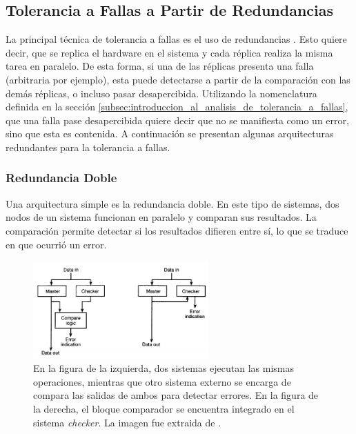 \subsection{Tolerancia a Fallas a Partir de Redundancias}

La principal técnica de tolerancia a fallas es el uso de redundancias \cite{nelson1990fault}\cite{prasad1989fault}\cite{lala1994architectural}. Esto quiere decir, que se replica el hardware en el sistema y cada réplica realiza la misma tarea en paralelo. De esta forma, si una de las réplicas presenta una falla (arbitraria por ejemplo), esta puede detectarse a partir de la comparación con las demás réplicas, o incluso pasar desapercibida. Utilizando la nomenclatura definida en la sección \ref{subsec:introduccion_al_analisis_de_tolerancia_a_fallas}, que una falla pase desapercibida quiere decir que no se manifiesta como un error, sino que esta es contenida. A continuación se presentan algunas arquitecturas redundantes para la tolerancia a fallas.

\subsubsection{Redundancia Doble}

Una arquitectura simple es la redundancia doble. En este tipo de sistemas, dos nodos de un sistema funcionan en paralelo y comparan sus resultados. La comparación permite detectar si los resultados difieren entre sí, lo que se traduce en que ocurrió un error.

\begin{figure}[H]
    \centering
    \includegraphics[width=0.6\textwidth]{img/3_4_lockstep_architecture.png}
    \caption{En la figura de la izquierda, dos sistemas ejecutan las mismas operaciones, mientras que otro sistema externo se encarga de compara las salidas de ambos para detectar errores. En la figura de la derecha, el bloque comparador se encuentra integrado en el sistema \textit{checker}. La imagen fue extraida de \cite{nelson1990fault}.}
    \label{fig:3_4_lockstep_architecture}
\end{figure}

